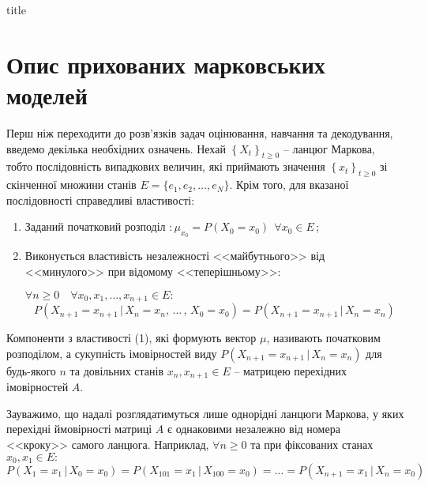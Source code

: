 \documentclass[a4paper,14pt]{extarticle} %
\begin{document}
{title}

\tableofcontents

\newpage

\section{Опис прихованих марковських моделей}

Перш ніж переходити до розв'язків задач оцінювання, навчання та декодування, введемо декілька необхідних означень. Нехай $\left\{ X_t \right\}_{t\geqslant 0}$ -- ланцюг Маркова, тобто послідовність випадкових величин, які приймають значення $\left\{ x_t \right\}_{t\geqslant 0}$ зі скінченної множини станів $E=\{e_1,e_2,\ldots,e_N\}$. Крім того, для вказаної послідовності справедливі властивості:
\begin{enumerate} [(1)]
    \item Заданий початковий розподіл $:\mu_{x_0}=P(X_0=x_0) \ \ \forall x_0 \in E$\,;
    \item Виконується властивість незалежності <<майбутнього>> від <<минулого>> при відомому <<теперішньому>>: 
    
    $\forall n\geqslant 0 \quad \forall x_0,x_1,\ldots,x_{n+1} \in E:$
	\[ P(X_{n+1}=x_{n+1} \, |\, X_n=x_n,\,\ldots\,,\, X_0=x_0)=P(X_{n+1}=x_{n+1} \, |\, X_n=x_n) \]
\end{enumerate}

Компоненти з властивості (1), які формують вектор $\mu$, називають початковим розподілом, а сукупність імовірностей виду $P(X_{n+1}=x_{n+1} \, |\, X_n=x_n)$ для будь-якого $n$ та довільних станів $x_n,x_{n+1} \in E$ -- матрицею перехідних імовірностей $A$.

Зауважимо, що надалі розглядатимуться лише однорідні ланцюги Маркова, у яких перехідні ймовірності матриці $A$ є однаковими незалежно від номера <<кроку>> самого ланцюга. Наприклад, $\forall n\geqslant 0$ та при фіксованих станах $x_0,x_1 \in E:$ 
\begin{equation*}
    P(X_1=x_1 \, |\, X_0=x_0)=P(X_{101}=x_1 \, |\, X_{100}=x_0)=\ldots=P(X_{n+1}=x_1 \, |\, X_n=x_0)
\end{equation*}
\end{document}
